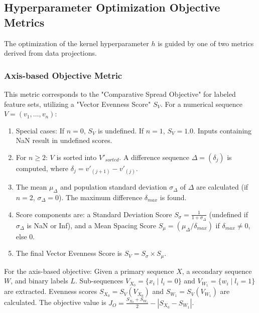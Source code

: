 \documentclass[conference]{IEEEtran}
\begin{document}
\subsection{Hyperparameter Optimization Objective Metrics}
The optimization of the kernel hyperparameter \(h\) is guided by one of two metrics derived from data projections.

\subsubsection{Axis-based Objective Metric}
This metric corresponds to the "Comparative Spread Objective" for labeled feature sets, utilizing a "Vector Evenness Score" \(S_V\).
For a numerical sequence \(V=(v_1, \dots, v_n)\):
\begin{enumerate}
    \item Special cases: If \(n=0\), \(S_V\) is undefined. If \(n=1\), \(S_V=1.0\). Inputs containing NaN result in undefined scores.
    \item For \(n \ge 2\): \(V\) is sorted into \(V'_{sorted}\). A difference sequence \(\Delta = (\delta_j)\) is computed, where \(\delta_j = v'_{(j+1)} - v'_{(j)}\).
    \item The mean \(\mu_{\Delta}\) and population standard deviation \(\sigma_{\Delta}\) of \(\Delta\) are calculated (if \(n=2\), \(\sigma_{\Delta}=0\)). The maximum difference \(\delta_{max}\) is found.
    \item Score components are: a Standard Deviation Score \(S_{\sigma} = \frac{1}{1 + \sigma_{\Delta}}\) (undefined if \(\sigma_{\Delta}\) is NaN or Inf), and a Mean Spacing Score \(S_{\mu} = (\mu_{\Delta}/\delta_{max})\) if \(\delta_{max} \neq 0\), else \(0\).
    \item The final Vector Evenness Score is \(S_V = S_{\sigma} \times S_{\mu}\).
\end{enumerate}
For the axis-based objective:
Given a primary sequence \(X\), a secondary sequence \(W\), and binary labels \(L\).
Sub-sequences \(V_{X_0} = \{x_i \mid l_i = 0\}\) and \(V_{W_1} = \{w_i \mid l_i = 1\}\) are extracted.
Evenness scores \(S_{X_0} = S_V(V_{X_0})\) and \(S_{W_1} = S_V(V_{W_1})\) are calculated.
The objective value is \(J_O = \frac{S_{X_0} + S_{W_1}}{2} - |S_{X_0} - S_{W_1}|\).
\end{document}
